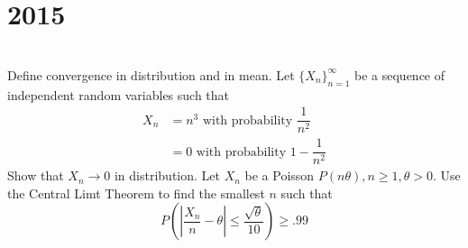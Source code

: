 \section*{2015}
\vspace{-.5cm}
\hrulefill \smallskip\\
 Define convergence in distribution and in mean. Let $\{X_n\}_{n=1}^{\infty}$ be a sequence of independent random variables such that \[ \begin{aligned}
    X_n &= n^3 \text{ with probability }\dfrac{1}{n^2} \\
    &= 0 \text{ with probability }1 - \dfrac{1}{n^2}
\end{aligned} \] Show that $X_n \rightarrow 0$ in distribution.
\myline
{} Let $X_n$ be a Poisson $P(n\theta), n\geq 1, \theta > 0$. Use the Central Limt Theorem to find the smallest $n$ such that \[ P \left(\left|\dfrac{X_n}{n} - \theta\right| \leq \dfrac{\sqrt{\theta}}{10} \right) \geq .99 \]